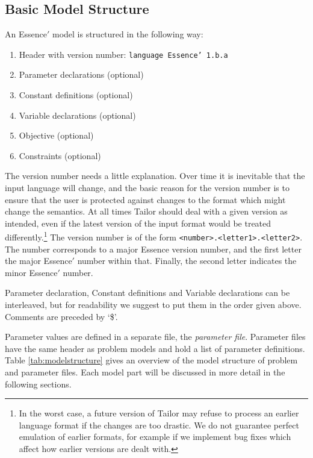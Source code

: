 \documentclass[oneside]{book}
\begin{document}
\subsection{Basic Model Structure}
An {\sc Essence}$'$ model is structured in the following way:

\begin{enumerate}
\item Header with version number: {\tt  language Essence' 1.b.a} 
\item Parameter declarations (optional)
\item Constant definitions (optional)
\item Variable declarations (optional)
\item Objective (optional)
\item Constraints (optional)
\end{enumerate}

The version number needs a little explanation.   Over time it is inevitable that the input language will change, and the basic reason for the version number is to ensure that the user is protected against changes to the format which might change the semantics.   At all times Tailor should deal with a given version as intended, even if the latest version of the input format would be treated differently.\footnote{In the worst case, a future version of Tailor may refuse to process an earlier language format if the changes are too drastic. We do not guarantee perfect emulation of earlier formats, for example if we implement bug fixes which affect how earlier versions are dealt with.}  
The version number is of the form \verb|<number>.<letter1>.<letter2>|.  The number corresponds to a major {\sc Essence} version number, and the first letter the major {\sc Essence}$'$ number within that.
Finally, the second letter indicates the minor {\sc Essence}$'$ number.

Parameter declaration, Constant definitions and Variable 
declarations can be interleaved, but for readability we suggest to put them in the 
order given above. Comments are preceded by `\$'.

Parameter values are defined in a separate file, the 
{\em parameter file}. Parameter files have the same header 
as problem models and hold a list of parameter definitions.
Table \ref{tab:modelstructure} gives an overview of the model
structure of problem and parameter files.
Each model part will be discussed in more detail in the following sections.
\end{document}

